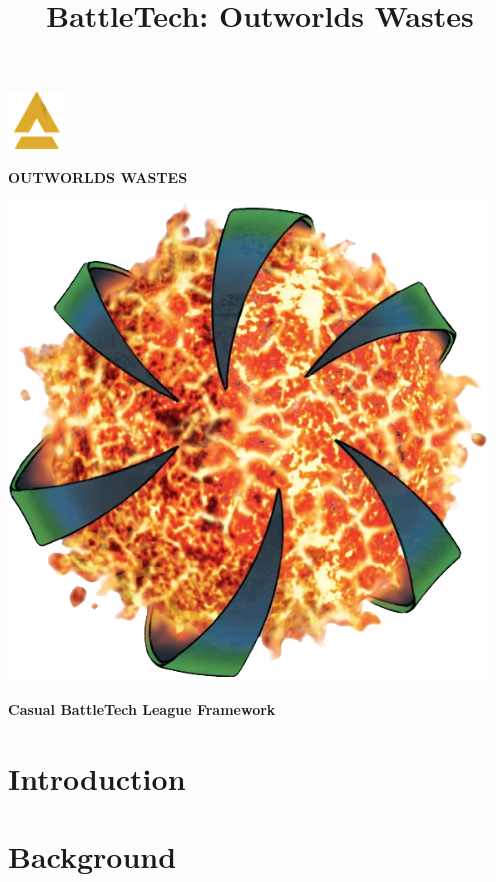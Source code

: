 \documentclass{article}
\title{BattleTech: Outworlds Wastes}
\author{}
\date{}
\newcommand{\mysectiontitle}{}
\newcommand{\newsection}[2]{\renewcommand{\mysectiontitle}{#2}\section{#1}}
\begin{document}
\makeatletter
{}

\begin{center}
  \mbox{\fontsize{50}{60}\bfseries{}\includegraphics[alt='a', width=0.6in, height=0.6in]{img/Battletech-A.png}\fontsize{50}{60}\bfseries{}}

  \fontsize{30}{37}\bfseries\selectfont\MakeUppercase{Outworlds Wastes}

  \includegraphics[alt='Outworlds Alliance logo', width=5in, height=5in]{img/Outworlds-Alliance.png}

  \LARGE\bfseries{Casual BattleTech League Framework}
\end{center}

\newsection{Introduction}{introduction}



\newpage

\newsection{Background}{background}
\end{document}
